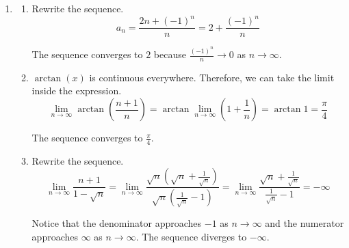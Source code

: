 \documentclass[a4paper, 12pt]{article}
\begin{document}
\begin{enumerate}[leftmargin=*,label=\textbf{\arabic*.}]
\item \begin{enumerate}[leftmargin=*,label=\textbf{\alph*.}]
\item Rewrite the sequence.
\[a_n=\frac{2n+(-1)^n}{n}=2+\frac{(-1)^n}n\]

The sequence converges to $\boxed2$ because $\displaystyle\frac{(-1)^n}n\to 0$ as $n\to\infty$.
\item $\arctan(x)$ is continuous everywhere. Therefore, we can take the limit inside the expression.
\[\lim_{n\to\infty}\arctan\left(\frac{n+1}n\right)=\arctan\lim_{n\to\infty}\left(1+\frac1n\right)=\arctan1=\frac\pi4\]

The sequence converges to $\displaystyle\boxed{\frac\pi4}$.
\item Rewrite the sequence.
\[\lim_{n\to\infty}\frac{n+1}{1-\sqrt n}=\lim_{n\to\infty}\frac{\sqrt n\left(\sqrt n+\frac1{\sqrt n}\right)}{\sqrt n\left(\frac1{\sqrt n}-1\right)}=\lim_{n\to\infty}\frac{\sqrt n+\frac1{\sqrt n}}{\frac1{\sqrt n}-1}=-\infty\]

Notice that the denominator approaches $-1$ as $n\to\infty$ and the numerator approaches $\infty$ as $n\to\infty$. The sequence diverges to $\boxed{-\infty}$.
\end{enumerate}
\end{enumerate}
\end{document}
